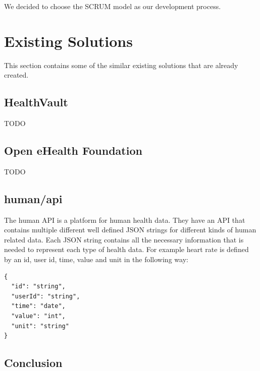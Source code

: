 We decided to choose the SCRUM model as our development process.	


\section{Existing Solutions}

This section contains some of the similar existing solutions that are already created.

\subsection{HealthVault}

TODO

\subsection{Open eHealth Foundation}

TODO

\subsection{human/api}

The human API is a platform for human health data. 
They have an API that contains multiple different well defined JSON strings for different kinds of human related data.
Each JSON string contains all the necessary information that is needed to represent each type of health data.
For example heart rate is defined by an id, user id, time, value and unit in the following way:

\begin{verbatim}
{
  "id": "string",
  "userId": "string",
  "time": "date",
  "value": "int",
  "unit": "string"
}
\end{verbatim}

\subsection{Conclusion}

